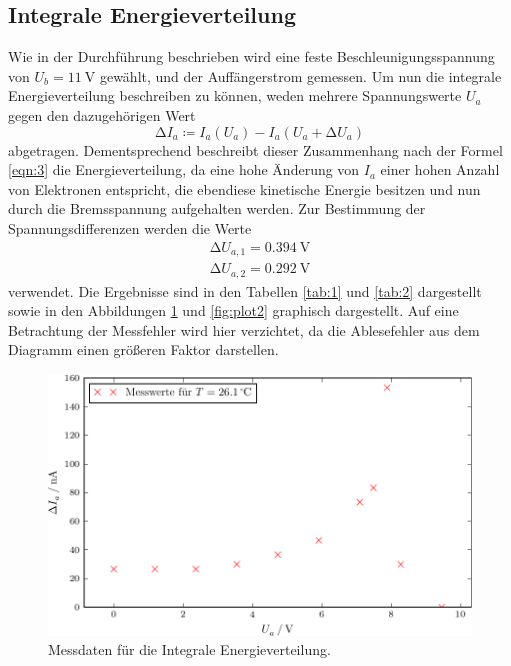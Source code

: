 \subsection{Integrale Energieverteilung}
Wie in der Durchführung beschrieben wird eine feste Beschleunigungsspannung von $U_b = \SI{11}{\volt}$ gewählt, und der Auffängerstrom gemessen.
Um nun die integrale Energieverteilung beschreiben zu können, weden mehrere Spannungswerte $U_a$ gegen den dazugehörigen Wert
\begin{equation}
  \increment I_a \coloneq I_a(U_a) - I_a(U_a + \increment U_a)
\end{equation}
abgetragen.
Dementsprechend beschreibt dieser Zusammenhang nach der Formel \eqref{eqn:3} die Energieverteilung, da eine hohe Änderung von $I_a$ einer hohen Anzahl von Elektronen entspricht, die ebendiese kinetische Energie besitzen und nun durch die Bremsspannung aufgehalten werden.
Zur Bestimmung der Spannungsdifferenzen werden die Werte
\begin{align*}
  \increment U_{a,1} = \SI{0,394}{\volt} \\
  \increment U_{a,2} = \SI{0.292}{\volt}
\end{align*}
verwendet.
Die Ergebnisse sind in den Tabellen \ref{tab:1} und \ref{tab:2} dargestellt sowie in den Abbildungen \ref{fig:plot1} und \ref{fig:plot2} graphisch dargestellt.
Auf eine Betrachtung der Messfehler wird hier verzichtet, da die Ablesefehler aus dem Diagramm einen größeren Faktor darstellen.




\begin{figure}[H]
  \centering
  \includegraphics{build/aufgabenteil_a_plot.pdf}
  \caption{Messdaten für die Integrale Energieverteilung.}
  \label{fig:plot1}
\end{figure}

